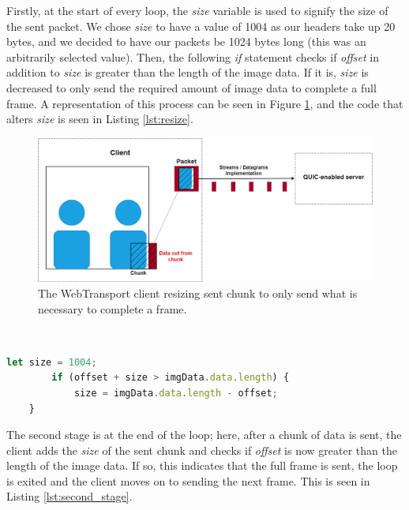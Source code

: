 Firstly, at the start of every loop, the \textit{size} variable is used to signify the size of the sent packet. We chose \textit{size} to have a value of 1004 as our headers take up 20 bytes, and we decided to have our packets be 1024 bytes long (this was an arbitrarily selected value). Then, the following \textit{if} statement checks if \textit{offset} in addition to \textit{size} is greater than the length of the image data. If it is, \textit{size} is decreased to only send the required amount of image data to complete a full frame. A representation of this process can be seen in Figure \ref{wt_sending_trimchunk}, and the code that alters \textit{size} is seen in Listing \ref{lst:resize}.

\begin{figure}[h]
    \centering
    \includegraphics[width=0.95\linewidth]{images/cutting chunk sending.png}
	\caption{The WebTransport client resizing sent chunk to only send what is necessary to complete a frame.}
    \label{wt_sending_trimchunk}
\end{figure}

\hfill{} \\

\begin{lstlisting}[language=javascript, caption={First part of functionality that exits loop when full frame is sent.}, label=lst:resize]
    let size = 1004;
        if (offset + size > imgData.data.length) {
            size = imgData.data.length - offset;
    }

\end{lstlisting}

The second stage is at the end of the loop; here, after a chunk of data is sent, the client adds the \textit{size} of the sent chunk and checks if \textit{offset} is now greater than the length of the image data. If so, this indicates that the full frame is sent, the loop is exited and the client moves on to sending the next frame.  This is seen in Listing \ref{lst:second_stage}.

